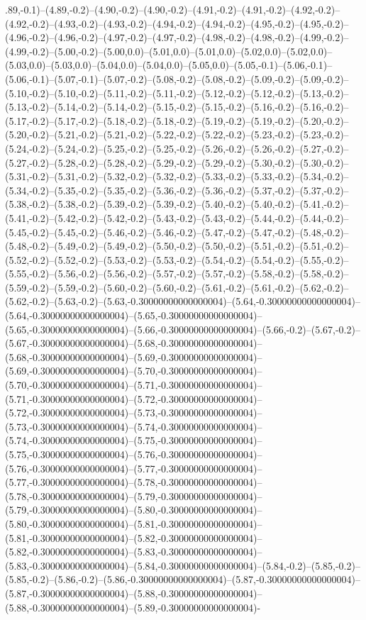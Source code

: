 .89,-0.1)--(4.89,-0.2)--(4.90,-0.2)--(4.90,-0.2)--(4.91,-0.2)--(4.91,-0.2)--(4.92,-0.2)--(4.92,-0.2)--(4.93,-0.2)--(4.93,-0.2)--(4.94,-0.2)--(4.94,-0.2)--(4.95,-0.2)--(4.95,-0.2)--(4.96,-0.2)--(4.96,-0.2)--(4.97,-0.2)--(4.97,-0.2)--(4.98,-0.2)--(4.98,-0.2)--(4.99,-0.2)--(4.99,-0.2)--(5.00,-0.2)--(5.00,0.0)--(5.01,0.0)--(5.01,0.0)--(5.02,0.0)--(5.02,0.0)--(5.03,0.0)--(5.03,0.0)--(5.04,0.0)--(5.04,0.0)--(5.05,0.0)--(5.05,-0.1)--(5.06,-0.1)--(5.06,-0.1)--(5.07,-0.1)--(5.07,-0.2)--(5.08,-0.2)--(5.08,-0.2)--(5.09,-0.2)--(5.09,-0.2)--(5.10,-0.2)--(5.10,-0.2)--(5.11,-0.2)--(5.11,-0.2)--(5.12,-0.2)--(5.12,-0.2)--(5.13,-0.2)--(5.13,-0.2)--(5.14,-0.2)--(5.14,-0.2)--(5.15,-0.2)--(5.15,-0.2)--(5.16,-0.2)--(5.16,-0.2)--(5.17,-0.2)--(5.17,-0.2)--(5.18,-0.2)--(5.18,-0.2)--(5.19,-0.2)--(5.19,-0.2)--(5.20,-0.2)--(5.20,-0.2)--(5.21,-0.2)--(5.21,-0.2)--(5.22,-0.2)--(5.22,-0.2)--(5.23,-0.2)--(5.23,-0.2)--(5.24,-0.2)--(5.24,-0.2)--(5.25,-0.2)--(5.25,-0.2)--(5.26,-0.2)--(5.26,-0.2)--(5.27,-0.2)--(5.27,-0.2)--(5.28,-0.2)--(5.28,-0.2)--(5.29,-0.2)--(5.29,-0.2)--(5.30,-0.2)--(5.30,-0.2)--(5.31,-0.2)--(5.31,-0.2)--(5.32,-0.2)--(5.32,-0.2)--(5.33,-0.2)--(5.33,-0.2)--(5.34,-0.2)--(5.34,-0.2)--(5.35,-0.2)--(5.35,-0.2)--(5.36,-0.2)--(5.36,-0.2)--(5.37,-0.2)--(5.37,-0.2)--(5.38,-0.2)--(5.38,-0.2)--(5.39,-0.2)--(5.39,-0.2)--(5.40,-0.2)--(5.40,-0.2)--(5.41,-0.2)--(5.41,-0.2)--(5.42,-0.2)--(5.42,-0.2)--(5.43,-0.2)--(5.43,-0.2)--(5.44,-0.2)--(5.44,-0.2)--(5.45,-0.2)--(5.45,-0.2)--(5.46,-0.2)--(5.46,-0.2)--(5.47,-0.2)--(5.47,-0.2)--(5.48,-0.2)--(5.48,-0.2)--(5.49,-0.2)--(5.49,-0.2)--(5.50,-0.2)--(5.50,-0.2)--(5.51,-0.2)--(5.51,-0.2)--(5.52,-0.2)--(5.52,-0.2)--(5.53,-0.2)--(5.53,-0.2)--(5.54,-0.2)--(5.54,-0.2)--(5.55,-0.2)--(5.55,-0.2)--(5.56,-0.2)--(5.56,-0.2)--(5.57,-0.2)--(5.57,-0.2)--(5.58,-0.2)--(5.58,-0.2)--(5.59,-0.2)--(5.59,-0.2)--(5.60,-0.2)--(5.60,-0.2)--(5.61,-0.2)--(5.61,-0.2)--(5.62,-0.2)--(5.62,-0.2)--(5.63,-0.2)--(5.63,-0.30000000000000004)--(5.64,-0.30000000000000004)--(5.64,-0.30000000000000004)--(5.65,-0.30000000000000004)--(5.65,-0.30000000000000004)--(5.66,-0.30000000000000004)--(5.66,-0.2)--(5.67,-0.2)--(5.67,-0.30000000000000004)--(5.68,-0.30000000000000004)--(5.68,-0.30000000000000004)--(5.69,-0.30000000000000004)--(5.69,-0.30000000000000004)--(5.70,-0.30000000000000004)--(5.70,-0.30000000000000004)--(5.71,-0.30000000000000004)--(5.71,-0.30000000000000004)--(5.72,-0.30000000000000004)--(5.72,-0.30000000000000004)--(5.73,-0.30000000000000004)--(5.73,-0.30000000000000004)--(5.74,-0.30000000000000004)--(5.74,-0.30000000000000004)--(5.75,-0.30000000000000004)--(5.75,-0.30000000000000004)--(5.76,-0.30000000000000004)--(5.76,-0.30000000000000004)--(5.77,-0.30000000000000004)--(5.77,-0.30000000000000004)--(5.78,-0.30000000000000004)--(5.78,-0.30000000000000004)--(5.79,-0.30000000000000004)--(5.79,-0.30000000000000004)--(5.80,-0.30000000000000004)--(5.80,-0.30000000000000004)--(5.81,-0.30000000000000004)--(5.81,-0.30000000000000004)--(5.82,-0.30000000000000004)--(5.82,-0.30000000000000004)--(5.83,-0.30000000000000004)--(5.83,-0.30000000000000004)--(5.84,-0.30000000000000004)--(5.84,-0.2)--(5.85,-0.2)--(5.85,-0.2)--(5.86,-0.2)--(5.86,-0.30000000000000004)--(5.87,-0.30000000000000004)--(5.87,-0.30000000000000004)--(5.88,-0.30000000000000004)--(5.88,-0.30000000000000004)--(5.89,-0.30000000000000004)-